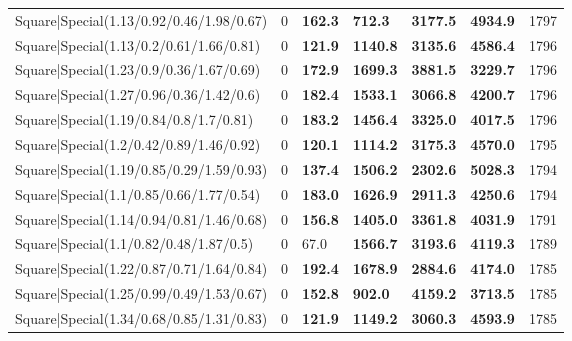 \begin{tabular}{lrllllr}
 Square|Special(1.13/0.92/0.46/1.98/0.67)                      &             0   & \textbf{162.3} & \textbf{712.3}  & \textbf{3177.5} & \textbf{4934.9} &         1797 \\
 Square|Special(1.13/0.2/0.61/1.66/0.81)                       &             0   & \textbf{121.9} & \textbf{1140.8} & \textbf{3135.6} & \textbf{4586.4} &         1796 \\
 Square|Special(1.23/0.9/0.36/1.67/0.69)                       &             0   & \textbf{172.9} & \textbf{1699.3} & \textbf{3881.5} & \textbf{3229.7} &         1796 \\
 Square|Special(1.27/0.96/0.36/1.42/0.6)                       &             0   & \textbf{182.4} & \textbf{1533.1} & \textbf{3066.8} & \textbf{4200.7} &         1796 \\
 Square|Special(1.19/0.84/0.8/1.7/0.81)                        &             0   & \textbf{183.2} & \textbf{1456.4} & \textbf{3325.0} & \textbf{4017.5} &         1796 \\
 Square|Special(1.2/0.42/0.89/1.46/0.92)                       &             0   & \textbf{120.1} & \textbf{1114.2} & \textbf{3175.3} & \textbf{4570.0} &         1795 \\
 Square|Special(1.19/0.85/0.29/1.59/0.93)                      &             0   & \textbf{137.4} & \textbf{1506.2} & \textbf{2302.6} & \textbf{5028.3} &         1794 \\
 Square|Special(1.1/0.85/0.66/1.77/0.54)                       &             0   & \textbf{183.0} & \textbf{1626.9} & \textbf{2911.3} & \textbf{4250.6} &         1794 \\
 Square|Special(1.14/0.94/0.81/1.46/0.68)                      &             0   & \textbf{156.8} & \textbf{1405.0} & \textbf{3361.8} & \textbf{4031.9} &         1791 \\
 Square|Special(1.1/0.82/0.48/1.87/0.5)                        &             0   & 67.0           & \textbf{1566.7} & \textbf{3193.6} & \textbf{4119.3} &         1789 \\
 Square|Special(1.22/0.87/0.71/1.64/0.84)                      &             0   & \textbf{192.4} & \textbf{1678.9} & \textbf{2884.6} & \textbf{4174.0} &         1785 \\
 Square|Special(1.25/0.99/0.49/1.53/0.67)                      &             0   & \textbf{152.8} & \textbf{902.0}  & \textbf{4159.2} & \textbf{3713.5} &         1785 \\
 Square|Special(1.34/0.68/0.85/1.31/0.83)                      &             0   & \textbf{121.9} & \textbf{1149.2} & \textbf{3060.3} & \textbf{4593.9} &         1785 \\

\end{tabular}

